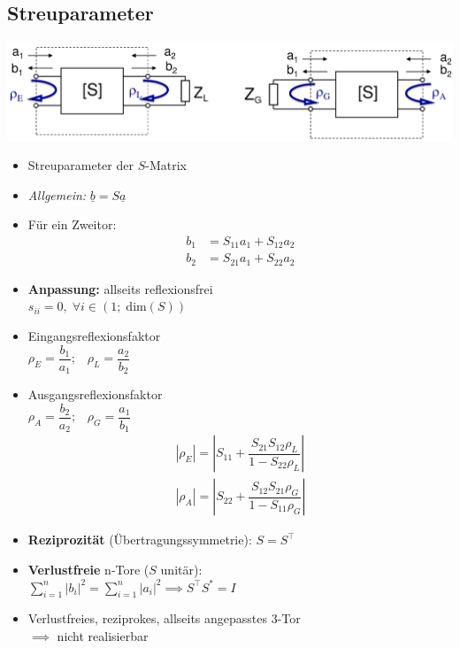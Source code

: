 {\subsection{Streuparameter}
\includegraphics[width=0.35\paperheight]{content/fuw/pictures/hf_zweitor_reflektion.png}
\begin{itemize}
    \itemsep0pt
    \item Streuparameter der $S$-Matrix
    \item \textit{Allgemein:} \(\underline{b} = S \underline{a}\)
    \item Für ein Zweitor:
    \begin{align*}
        b_1 &= S_{11} a_1 + S_{12} a_2\\
        b_2 &= S_{21} a_1 + S_{22} a_2
    \end{align*}
    \item \textbf{Anpassung:} allseits reflexionsfrei\\
        \(s_{ii} = 0, \;\forall i \in (1;\; \mathrm{dim}(S))\)
    \item Eingangsreflexionsfaktor\\
        \(\rho_E = \dfrac{b_1}{a_1}; \;\;\; \rho_L = \dfrac{a_2}{b_2}\)
    \item Ausgangsreflexionsfaktor\\
        \(\rho_A = \dfrac{b_2}{a_2}; \;\;\; \rho_G = \dfrac{a_1}{b_1}\)
        \begin{align*}
            |\rho_E| = \left|S_{11} + \dfrac{S_{21} S_{12} \rho_L}{1 - S_{22} \rho_L}\right|\\
            |\rho_A| = \left|S_{22} + \dfrac{S_{12} S_{21} \rho_G}{1 - S_{11} \rho_G}\right|
        \end{align*}
    \item \textbf{Reziprozität} (Übertragungssymmetrie): \(S = S^\top\)
    \item \textbf{Verlustfreie} n-Tore ($S$ unitär):\\
        \(\sum^n_{i=1} |b_i|^2 = \sum^n_{i=1} |a_i|^2 \implies S^\top S^* = I\)
    \item Verlustfreies, reziprokes, allseits angepasstes 3-Tor\\
        \(\implies\) nicht realisierbar
\end{itemize}
}

